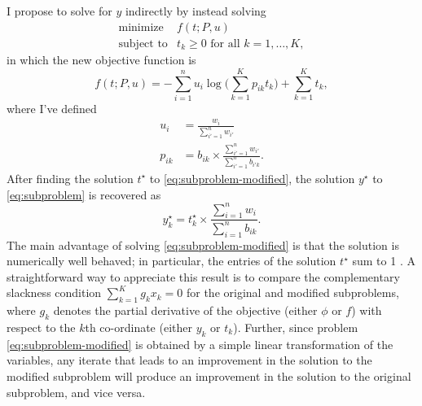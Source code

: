 \documentclass[final]{siamart171218}
\begin{document}
I propose to solve for $y$ indirectly by instead solving
\begin{equation}
\begin{array}{ll}
\mbox{minimize}   & f(t; P, u) \\
\mbox{subject to} & \mbox{$t_k \geq 0$ for all $k = 1, \ldots, K$},
\label{eq:subproblem-modified}
\end{array}
\end{equation}
in which the new objective function is
\begin{equation}
f(t; P, u) =
    - \sum_{i=1}^n u_i \log\big({\textstyle \sum_{k=1}^K p_{ik} t_k}\big)
    + \sum_{k=1}^K t_k,
\end{equation}
where I've defined
\begin{align*}
u_i    &= \frac{w_i}{\sum_{i'=1}^n w_{i'}} \\
p_{ik} &= b_{ik} \times \frac{\sum_{i'=1}^n w_{i'}}{\sum_{i'=1}^n b_{i'k}}.
\end{align*}
After finding the solution $t^{\star}$ to
\eqref{eq:subproblem-modified}, the solution $y^{\star}$ to
\eqref{eq:subproblem} is recovered as
\begin{equation}
y_k^{\star} = t_k^{\star} \times
  \frac{\sum_{i=1}^n w_i}{\sum_{i=1}^n b_{ik}}.
\end{equation}
The main advantage of solving \eqref{eq:subproblem-modified} is that
the solution is numerically well behaved; in particular, the entries
of the solution $t^{\star}$ sum to 1 \cite{kim-2019}. A
straightforward way to appreciate this result is to compare the
complementary slackness condition $\sum_{k=1}^K g_k x_k = 0$ for the
original and modified subproblems, where $g_k$ denotes the partial
derivative of the objective (either $\phi$ or $f$) with respect to the
$k$th co-ordinate (either $y_k$ or $t_k$). Further, since problem
\eqref{eq:subproblem-modified} is obtained by a simple linear
transformation of the variables, any iterate that leads to an
improvement in the solution to the modified subproblem will produce an
improvement in the solution to the original subproblem, and vice
versa.



\end{document}
